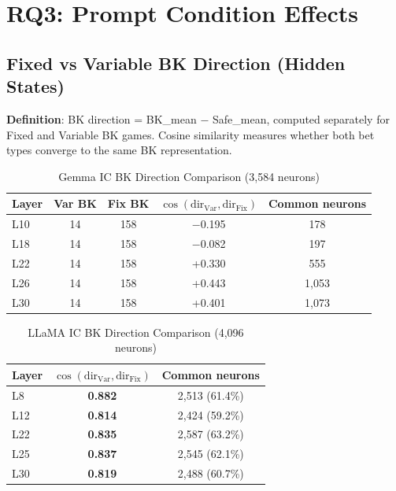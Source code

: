 \documentclass[11pt,a4paper]{article}
\begin{document}
\section{RQ3: Prompt Condition Effects}

\subsection{Fixed vs Variable BK Direction (Hidden States)}\label{sec:bkdir}

\textbf{Definition}: BK direction = BK\_mean $-$ Safe\_mean, computed separately for Fixed and Variable BK games. Cosine similarity measures whether both bet types converge to the same BK representation.

\begin{table}[H]
\centering
\caption{Gemma IC BK Direction Comparison (3,584 neurons)}\label{tab:t20}
\footnotesize
\begin{tabular}{lcccc}
\toprule
Layer & Var BK & Fix BK & $\cos(\mathrm{dir_{Var}}, \mathrm{dir_{Fix}})$ & Common neurons \\
\midrule
L10 & 14 & 158 & $-$0.195 & 178 \\
L18 & 14 & 158 & $-$0.082 & 197 \\
L22 & 14 & 158 & +0.330  & 555 \\
L26 & 14 & 158 & +0.443  & 1,053 \\
L30 & 14 & 158 & +0.401  & 1,073 \\
\bottomrule
\end{tabular}
\end{table}

\begin{table}[H]
\centering
\caption{LLaMA IC BK Direction Comparison (4,096 neurons)}\label{tab:t21}
\footnotesize
\begin{tabular}{lcc}
\toprule
Layer & $\cos(\mathrm{dir_{Var}}, \mathrm{dir_{Fix}})$ & Common neurons \\
\midrule
L8  & \textbf{0.882} & 2,513 (61.4\%) \\
L12 & \textbf{0.814} & 2,424 (59.2\%) \\
L22 & \textbf{0.835} & 2,587 (63.2\%) \\
L25 & \textbf{0.837} & 2,545 (62.1\%) \\
L30 & \textbf{0.819} & 2,488 (60.7\%) \\
\bottomrule
\end{tabular}
\end{table}
\end{document}
